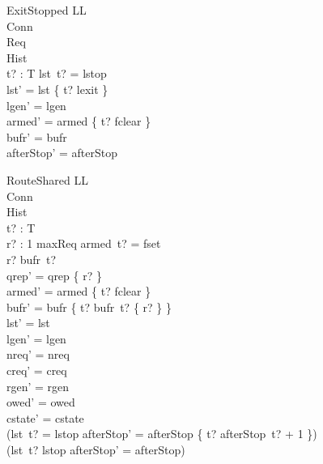 \documentclass[a4paper,10pt,fleqn]{article}
\begin{document}
\begin{schema}{ExitStopped}
  \Delta LL \\
  \Xi Conn \\
  \Xi Req \\
  \Xi Hist \\
  t? : T
\where
  lst~t? = lstop \\
  lst' = lst \oplus \{ t? \mapsto lexit \} \\
  lgen' = lgen \\
  armed' = armed \oplus \{ t? \mapsto fclear \} \\
  bufr' = bufr \\
  afterStop' = afterStop
\end{schema}

\begin{schema}{RouteShared}
  \Delta LL \\
  \Xi Conn \\
  \Xi Hist \\
  t? : T \\
  r? : 1 \upto maxReq
\where
  armed~t? = fset \\
  r? \in bufr~t? \\
  qrep' = qrep \cup \{ r? \} \\
  armed' = armed \oplus \{ t? \mapsto fclear \} \\
  bufr' = bufr \oplus \{ t? \mapsto bufr~t? \setminus \{ r? \} \} \\
  lst' = lst \\
  lgen' = lgen \\
  nreq' = nreq \\
  creq' = creq \\
  rgen' = rgen \\
  owed' = owed \\
  cstate' = cstate \\
  (lst~t? = lstop \implies
    afterStop' = afterStop \oplus \{ t? \mapsto afterStop~t? + 1 \}) \\
  (lst~t? \neq lstop \implies afterStop' = afterStop)
\end{schema}
\end{document}
